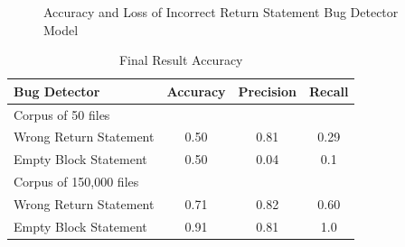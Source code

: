 \documentclass[sigconf]{acmart}
\begin{document}
\begin{figure}[!htb]
    \centering
    \qquad
    \caption{Accuracy and Loss of Incorrect Return Statement Bug Detector Model }%
    \label{fig:accuracy_and_loss_incorrect_return_statement}%
\end{figure}


  
\begin{table}[h!]
    \centering
    \begin{tabular}{l ccc}
        \hline
        Bug Detector & Accuracy & Precision & Recall\\
        \hline
        \hline
        Corpus of 50 files & & & \\
        \cline{1-1}
        Wrong Return Statement & 0.50 & 0.81 & 0.29 \\
        Empty Block Statement & 0.50 & 0.04 & 0.1 \\
        \hline
        Corpus of 150,000 files & & & \\
        \cline{1-1}
        Wrong Return Statement & 0.71 & 0.82 & 0.60 \\
        Empty Block Statement & 0.91 & 0.81 & 1.0 \\
        \hline
    \end{tabular}
    \caption{Final Result Accuracy}
    \label{tab:my_label}
\end{table}  
\end{document}
